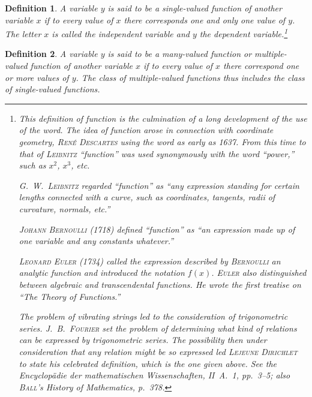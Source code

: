 \documentclass[a4paper,12pt]{book}[2004/02/16]
\providecommand{\hyperlink}[2]{#2}
\providecommand{\hypertarget}[2]{#2}
\theoremstyle{ilemma}
\theoremstyle{itheorem}
\theoremstyle{iother}
\theoremstyle{icorollary}
\theoremstyle{numcorollary}
\theoremstyle{idefinition}
\newtheorem*{definition}{Definition}
\begin{document}
\begin{definition}
A variable $y$ is said to be a \emph{single-valued function} of
another variable $x$ if to every value of $x$ there corresponds one
and only one value of $y$. The letter $x$ is called the
\emph{independent} variable and $y$ the \emph{dependent}
variable.\footnote{%
  \protect\hypertarget{fn}{}This definition of function is the culmination of a long development
  of the use of the word. The idea of function arose in connection
  with coordinate geometry, \textsc{Ren\'e Descartes} using the word
  as early as 1637. From this time to that of \textsc{Leibnitz}
  ``function'' was used synonymously with the word ``power,'' such as
  $x^2$, $x^3$, etc.

  \textsc{G.~W.~Leibnitz} regarded ``function'' as ``any expression
  standing for certain lengths connected with a curve, such as
  coordinates, tangents, radii of curvature, normals, etc.''

  \textsc{Johann Bernoulli} (1718) defined ``function'' as ``an
  expression made up of one variable and any constants whatever.''

  \textsc{Leonard Euler} (1734) called the expression described by
  \textsc{Bernoulli} an analytic function and introduced the notation
  $f(x)$. \textsc{Euler} also distinguished between algebraic and
  transcendental functions. He wrote the first treatise on ``The
  Theory of Functions.''

  The problem of vibrating strings led to the consideration of
  trigonometric series. \textsc{J.~B.~Fourier} set the problem of
  determining what kind of relations can be expressed by trigonometric
  series. The possibility then under consideration that any relation
  might be so expressed led \textsc{Lejeune Dirichlet} to state his
  celebrated definition, which is the one given above. See the
  Encyclop\"adie der mathematischen Wissenschaften, II~A.~1, pp.~3--5;
  also \textsc{Ball}'s History of Mathematics, p.~378.}
\end{definition}

\begin{definition}
A variable $y$ is said to be a many-valued function or multiple-valued
function of another variable $x$ if to every value of $x$ there
correspond one or more values of $y$.  The class of multiple-valued
functions thus includes the class of single-valued
functions.\hyperlink{fn}{\footnotemark[1]}
\end{definition}
\end{document}

